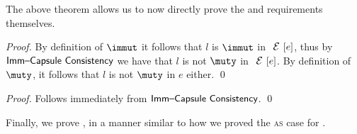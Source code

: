 \LS

The above theorem allows us to now directly prove the  and  requirements themselves.

\setcounter{requirement}{1}
\SS\REQImmCons
\SS\begin{proof}
	By definition of $\immut$ it follows that $l$ is $\immut$ in $\E[e]$,
	thus by $\textsf{Imm--Capsule Consistency}$ we have
	that $l$ is not $\muty$ in $\E[e]$. By definition of $\muty$,
	it follows that $l$ is not $\muty$ in $e$ either.
\qed\end{proof}

\LS

\setcounter{requirement}{3}
\SS\REQCapCons
\SS\begin{proof}
	Follows immediately from $\textsf{Imm--Capsule Consistency}$.
\qed\end{proof}

\LS

Finally, we prove , in a manner similar to how we proved the \textsc{as} case for .

